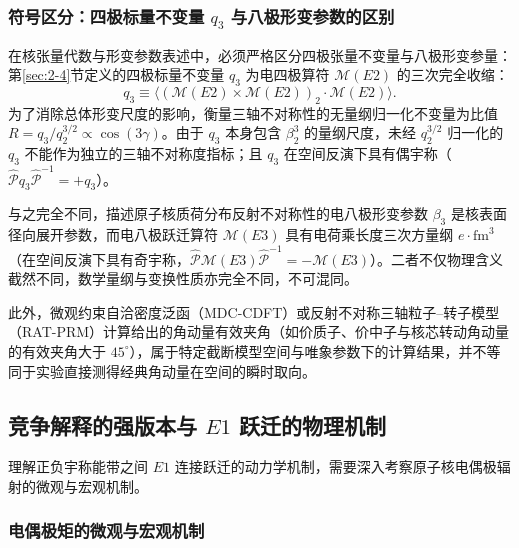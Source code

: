 \subsubsection{符号区分：四极标量不变量 $q_3$ 与八极形变参数的区别}

在核张量代数与形变参数表述中，必须严格区分四极张量不变量与八极形变参量：
第\ref{sec:2-4}节定义的四极标量不变量 $q_3$ 为电四极算符 $\mathcal{M}(E2)$ 的三次完全收缩：
\begin{equation}\label{eq:4-5-q3-def}
q_3 \equiv \langle (\mathcal{M}(E2) \times \mathcal{M}(E2))_2 \cdot \mathcal{M}(E2) \rangle .
\end{equation}
为了消除总体形变尺度的影响，衡量三轴不对称性的无量纲归一化不变量为比值 $R = q_3 / q_2^{3/2} \propto \cos(3\gamma)$。由于 $q_3$ 本身包含 $\beta_2^3$ 的量纲尺度，未经 $q_2^{3/2}$ 归一化的 $q_3$ 不能作为独立的三轴不对称度指标；且 $q_3$ 在空间反演下具有偶宇称（$\hat{\mathcal{P}} q_3 \hat{\mathcal{P}}^{-1} = +q_3$）。

与之完全不同，描述原子核质荷分布反射不对称性的电八极形变参数 $\beta_3$ 是核表面径向展开参数，而电八极跃迁算符 $\mathcal{M}(E3)$ 具有电荷乘长度三次方量纲 $e\cdot\mathrm{fm}^3$（在空间反演下具有奇宇称，$\hat{\mathcal{P}} \mathcal{M}(E3) \hat{\mathcal{P}}^{-1} = -\mathcal{M}(E3)$）。二者不仅物理含义截然不同，数学量纲与变换性质亦完全不同，不可混同。

此外，微观约束自洽密度泛函（MDC-CDFT）或反射不对称三轴粒子--转子模型（RAT-PRM）计算给出的角动量有效夹角（如价质子、价中子与核芯转动角动量的有效夹角大于 $45^\circ$），属于特定截断模型空间与唯象参数下的计算结果，并不等同于实验直接测得经典角动量在空间的瞬时取向。

\subsection{竞争解释的强版本与 $E1$ 跃迁的物理机制}\label{sec:4-5-4}

理解正负宇称能带之间 $E1$ 连接跃迁的动力学机制，需要深入考察原子核电偶极辐射的微观与宏观机制。

\subsubsection{电偶极矩的微观与宏观机制}

